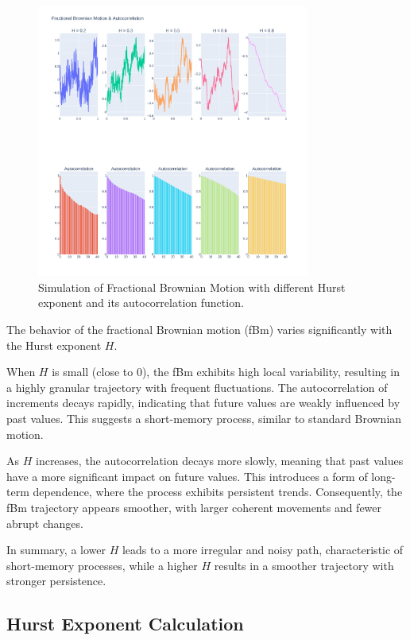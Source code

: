 \documentclass[11pt]{extarticle}
\begin{document}
\begin{figure}[!ht]
    \centering
    \includegraphics[width=0.8\textwidth]{img/fdm_autocorr}
    \caption{Simulation of Fractional Brownian Motion with different Hurst exponent and its autocorrelation function.}
    \label{fig:fbm_autocorr}
\end{figure}

\FloatBarrier

The behavior of the fractional Brownian motion (fBm) varies significantly with the Hurst exponent \( H \).

When \( H \) is small (close to 0), the fBm exhibits high local variability, resulting in a highly granular trajectory with frequent fluctuations. The autocorrelation of increments decays rapidly, indicating that future values are weakly influenced by past values. This suggests a short-memory process, similar to standard Brownian motion.

As \( H \) increases, the autocorrelation decays more slowly, meaning that past values have a more significant impact on future values. This introduces a form of long-term dependence, where the process exhibits persistent trends. Consequently, the fBm trajectory appears smoother, with larger coherent movements and fewer abrupt changes.

In summary, a lower \( H \) leads to a more irregular and noisy path, characteristic of short-memory processes, while a higher \( H \) results in a smoother trajectory with stronger persistence.

\subsection{Hurst Exponent Calculation}
\end{document}
